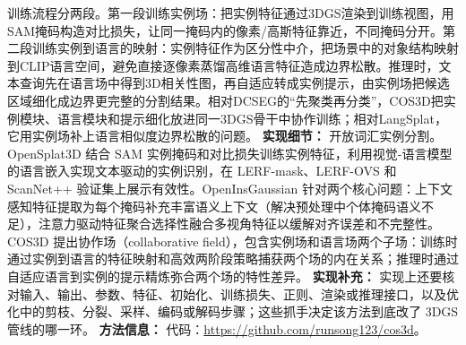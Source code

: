 训练流程分两段。第一段训练实例场：把实例特征通过3DGS渲染到训练视图，用SAM掩码构造对比损失，让同一掩码内的像素/高斯特征靠近，不同掩码分开。第二段训练实例到语言的映射：实例特征作为区分性中介，把场景中的对象结构映射到CLIP语言空间，避免直接逐像素蒸馏高维语言特征造成边界松散。推理时，文本查询先在语言场中得到3D相关性图，再自适应转成实例提示，由实例场把候选区域细化成边界更完整的分割结果。相对DCSEG的“先聚类再分类”，COS3D把实例模块、语言模块和提示细化放进同一3DGS骨干中协作训练；相对LangSplat，它用实例场补上语言相似度边界松散的问题。
\textbf{实现细节：} 开放词汇实例分割。OpenSplat3D 结合 SAM 实例掩码和对比损失训练实例特征，利用视觉-语言模型的语言嵌入实现文本驱动的实例识别，在 LERF-mask、LERF-OVS 和 ScanNet++ 验证集上展示有效性。OpenInsGaussian 针对两个核心问题：上下文感知特征提取为每个掩码补充丰富语义上下文（解决预处理中个体掩码语义不足），注意力驱动特征聚合选择性融合多视角特征以缓解对齐误差和不完整性。COS3D 提出协作场（collaborative field），包含实例场和语言场两个子场：训练时通过实例到语言的特征映射和高效两阶段策略捕获两个场的内在关系；推理时通过自适应语言到实例的提示精炼弥合两个场的特性差异。
\textbf{实现补充：} 实现上还要核对输入、输出、参数、特征、初始化、训练损失、正则、渲染或推理接口，以及优化中的剪枝、分裂、采样、编码或解码步骤；这些抓手决定该方法到底改了 3DGS 管线的哪一环。
\textbf{方法信息：} 代码：\url{https://github.com/runsong123/cos3d}。



